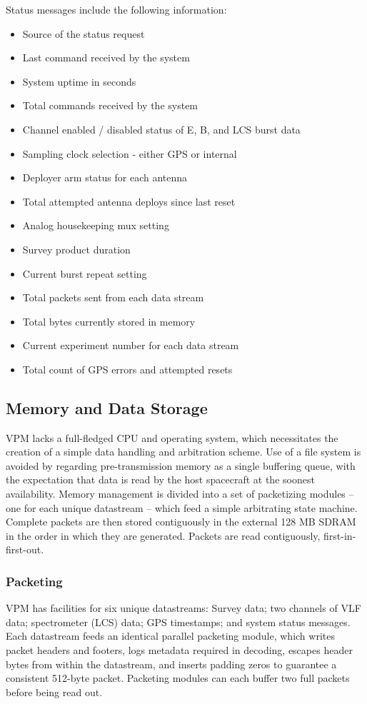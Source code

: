 Status messages include the following information:
\begin{itemize}[noitemsep]
\item Source of the status request
\item Last command received by the system
\item System uptime in seconds
\item Total commands received by the system
\item Channel enabled / disabled status of E, B, and LCS burst data
\item Sampling clock selection - either GPS or internal
\item Deployer arm status for each antenna
\item Total attempted antenna deploys since last reset
\item Analog housekeeping mux setting
\item Survey product duration
\item Current burst repeat setting
\item Total packets sent from each data stream
\item Total bytes currently stored in memory
\item Current experiment number for each data stream
\item Total count of GPS errors and attempted resets
\end{itemize}
\subsection{Memory and Data Storage}
VPM lacks a full-fledged CPU and operating system, which necessitates the creation of a simple data handling and arbitration scheme. Use of a file system is avoided by regarding pre-transmission memory as a single buffering queue, with the expectation that data is read by the host spacecraft at the soonest availability. Memory management is divided into a set of packetizing modules -- one for each unique datastream -- which feed a simple arbitrating state machine. Complete packets are then stored contiguously in the external 128 MB SDRAM in the order in which they are generated. Packets are read contiguously, first-in-first-out. 

\subsubsection{Packeting}
VPM has facilities for six unique datastreams: Survey data; two channels of VLF data; spectrometer (LCS) data; GPS timestamps; and system status messages. Each datastream feeds an identical parallel packeting module, which writes packet headers and footers, logs metadata required in decoding, escapes header bytes from within the datastream, and inserts padding zeros to guarantee a consistent 512-byte packet. Packeting modules can each buffer two full packets before being read out.

